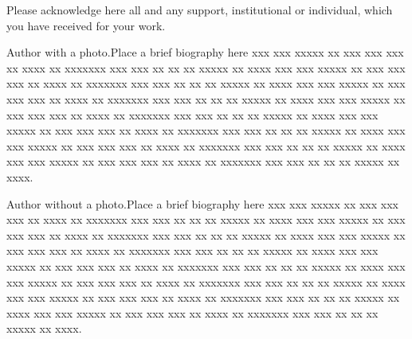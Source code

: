 \documentclass{amcs}
\begin{document}
\begin{acknowledgment}
Please acknowledge here all and any support, institutional or individual, which you have received for your work.
\end{acknowledgment}



\begin{biography}[photo]{Author with a photo.}Place a brief biography here xxx xxx xxxxx xx xxx xxx xxx xx xxxx xx xxxxxxx xxx xxx xx xx xx xxxxx xx xxxx xxx xxx xxxxx xx xxx xxx xxx xx xxxx xx xxxxxxx xxx xxx xx xx xx xxxxx xx xxxx xxx xxx xxxxx xx xxx xxx xxx xx xxxx xx xxxxxxx xxx xxx xx xx xx xxxxx xx xxxx xxx xxx xxxxx xx xxx xxx xxx xx xxxx xx xxxxxxx xxx xxx xx xx xx xxxxx xx xxxx xxx xxx xxxxx xx xxx xxx xxx xx xxxx xx xxxxxxx xxx xxx xx xx xx xxxxx xx xxxx xxx xxx xxxxx xx xxx xxx xxx xx xxxx xx xxxxxxx xxx xxx xx xx xx xxxxx xx xxxx xxx xxx xxxxx xx xxx xxx xxx xx xxxx xx xxxxxxx xxx xxx xx xx xx xxxxx xx xxxx.
\end{biography}

\begin{biography}[]{Author without a photo.}Place a brief biography here xxx xxx xxxxx xx xxx xxx xxx xx xxxx xx xxxxxxx xxx xxx xx xx xx xxxxx xx xxxx xxx xxx xxxxx xx xxx xxx xxx xx xxxx xx xxxxxxx xxx xxx xx xx xx xxxxx xx xxxx xxx xxx xxxxx xx xxx xxx xxx xx xxxx xx xxxxxxx xxx xxx xx xx xx xxxxx xx xxxx xxx xxx xxxxx xx xxx xxx xxx xx xxxx xx xxxxxxx xxx xxx xx xx xx xxxxx xx xxxx xxx xxx xxxxx xx xxx xxx xxx xx xxxx xx xxxxxxx xxx xxx xx xx xx xxxxx xx xxxx xxx xxx xxxxx xx xxx xxx xxx xx xxxx xx xxxxxxx xxx xxx xx xx xx xxxxx xx xxxx xxx xxx xxxxx xx xxx xxx xxx xx xxxx xx xxxxxxx xxx xxx xx xx xx xxxxx xx xxxx.
\end{biography}

\end{document}
